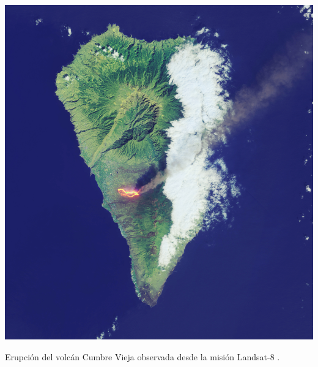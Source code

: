 \begin{marginfigure}[3.0cm]
	\includegraphics{figs/introduction/landsat8_lapalma.jpg}
	\caption{Erupción del volcán Cumbre Vieja observada desde la misión Landsat-8 \cite{nasa_earth_observatory_lava_2021}.}
	\label{fig:la_palma_landsat8_spanish}
\end{marginfigure}
